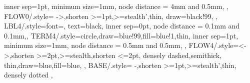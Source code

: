 {{                    	inner sep=1pt, minimum size=1mm, 
			node distance = 4mm and 0.5mm, },
        FLOW0/.style={ ->,shorten >=1pt,>=stealth',thin,
                    draw=black!99, },
%
%
        LBL4/.style={font=\scriptsize, text=black, inner sep=0pt,
                node distance = 0.1mm and 0.1mm,},
        TERM4/.style={circle,draw=blue!99,fill=blue!1,thin,
                        inner sep=1pt, minimum size=1mm,
                        node distance = 0.5mm and 0.5mm, },
        FLOW4/.style={<->,shorten >=2pt,>=stealth,shorten <=2pt,
			densely dashed,semithick,
                        thin,draw=blue,fill=blue, },
        BASE/.style={ -,shorten >=1pt,>=stealth',thin,
                     densely dotted },
}
%
%
\def\VSPACE{5mm}
%
%
%
\newcommand{\FLOWPART}[3]{
%
\def\MINMSG{#2}
\def\MAXMSG{#3}
\def\LASTDEV{0}
%
\ifx\theCNTMSG\undefined
  \newcounter{CNTMSG}
\fi
\pgfmathsetcounter{CNTMSG}{0}
%
\ifx\theCNTSHIFT\undefined
  \newcounter{CNTSHIFT}
\fi
\pgfmathsetcounter{CNTSHIFT}{0}
%
\ifx\theCNTDEV\undefined
  \newcounter{CNTDEV}
\fi
\pgfmathsetcounter{CNTDEV}{0}
%

%
\ENDLINE
}
\newcommand{\MESSAGE}[6]{
   \stepcounter{CNTMSG}
   \pgfmathparse{ \MINMSG  < \theCNTMSG + 1 }
   \if 1\pgfmathresult
   \pgfmathparse{ \MAXMSG  > \theCNTMSG - 1 }
   \if 1\pgfmathresult
   \stepcounter{CNTSHIFT}
%
   \pgfmathparse{ #1 > #2 } 
   \if 1\pgfmathresult
	\def\SIDE{right}
	\def\ASIDE{left}
	\def\ANCH{east}
	\def\AANCH{west}
   \else 
	\def\SIDE{left}
	\def\ASIDE{right}
	\def\ANCH{west} 
	\def\AANCH{east}
   \fi
%
   \pgfmathparse{ \theCNTMSG  <  10 }
   \if 1\pgfmathresult
        \def\FNODE{ \theCNTMSG}
   \else
        \def\FNODE{\theCNTMSG}
   \fi
%
   \node (START\theCNTMSG) [TERM#6] at ($ (DEV#1.south) - \theCNTSHIFT *(0,\VSPACE) $) {\tiny \FNODE};
   \node (STOP\theCNTMSG) [TERM#6]   at ($ (DEV#2.south) - \theCNTSHIFT *(0,\VSPACE) $) {\tiny \FNODE};
     \begin{pgfonlayer}{FGR}
     \draw [FLOW#6] (START\theCNTMSG) -- (STOP\theCNTMSG) node (LABEL\theCNTMSG)
             [LBL#6,above,pos=0.5] {#4};
%
      \node (LABELp\theCNTMSG) [LBL#6,\SIDE =of START\theCNTMSG.\ANCH] {#3};
      \node (LABELq\theCNTMSG) [LBL#6,\ASIDE =of STOP\theCNTMSG.\AANCH] {#5};
     \end{pgfonlayer}{FGR}
       \edef\CNTMSGLAST{\theCNTMSG}
  \fi
  \fi
}
